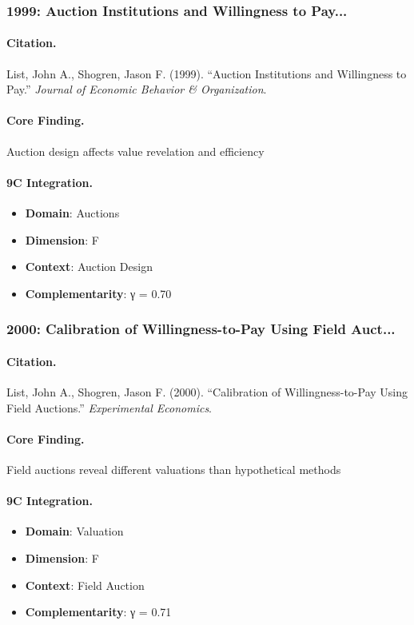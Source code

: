 \subsubsection{1999: Auction Institutions and Willingness to Pay...}

\paragraph{Citation.}
List, John A., Shogren, Jason F. (1999). ``Auction Institutions and Willingness to Pay.''
\textit{Journal of Economic Behavior & Organization}.

\paragraph{Core Finding.}
Auction design affects value revelation and efficiency

\paragraph{9C Integration.}
\begin{itemize}[nosep]
  \item \textbf{Domain}: Auctions
  \item \textbf{Dimension}: F
  \item \textbf{Context}: Auction Design
  \item \textbf{Complementarity}: γ = 0.70
\end{itemize}


\subsubsection{2000: Calibration of Willingness-to-Pay Using Field Auct...}

\paragraph{Citation.}
List, John A., Shogren, Jason F. (2000). ``Calibration of Willingness-to-Pay Using Field Auctions.''
\textit{Experimental Economics}.

\paragraph{Core Finding.}
Field auctions reveal different valuations than hypothetical methods

\paragraph{9C Integration.}
\begin{itemize}[nosep]
  \item \textbf{Domain}: Valuation
  \item \textbf{Dimension}: F
  \item \textbf{Context}: Field Auction
  \item \textbf{Complementarity}: γ = 0.71
\end{itemize}


